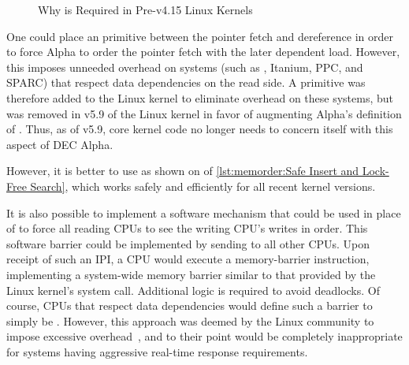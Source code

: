 \begin{figure}
\centering
{}
\caption{Why  is Required in Pre-v4.15 Linux Kernels}
\label{fig:memorder:fig:memorder:Why smp-read-barrier-depends() is Required in Pre-v4.15 Linux Kernels}
\end{figure}

One could place an  primitive
between the pointer fetch and dereference in order to force Alpha
to order the pointer fetch with the later dependent load.
However, this imposes unneeded overhead on systems (such as \ARM,
Itanium, PPC, and SPARC) that respect data dependencies on the read side.
A  primitive was therefore added to the
Linux kernel to eliminate overhead on these systems, but was removed
in v5.9 of the Linux kernel in favor of augmenting Alpha's definition
of .
Thus, as of v5.9, core kernel code no longer needs to concern itself
with this aspect of DEC Alpha.
\begin{fcvref}
\end{fcvref}
\begin{fcvref}
However, it is better to use 
as shown on  of
\cref{lst:memorder:Safe Insert and Lock-Free Search},
which works safely and efficiently for all recent kernel versions.
\end{fcvref}

It is also possible to implement a software mechanism
that could be used in place of  to force
all reading CPUs to see the writing CPU's writes in order.
This software barrier could be implemented by sending 
to all other CPUs.
Upon receipt of such an IPI, a CPU would execute a memory-barrier
instruction, implementing a system-wide memory barrier similar to that
provided by the Linux kernel's  system call.
Additional logic is required to avoid deadlocks.
Of course, CPUs that respect data dependencies would define such a barrier
to simply be .
However, this approach was deemed by the Linux community
to impose excessive overhead~\cite{McKenney01f}, and to their point would
be completely inappropriate for systems having
aggressive real-time response requirements.

